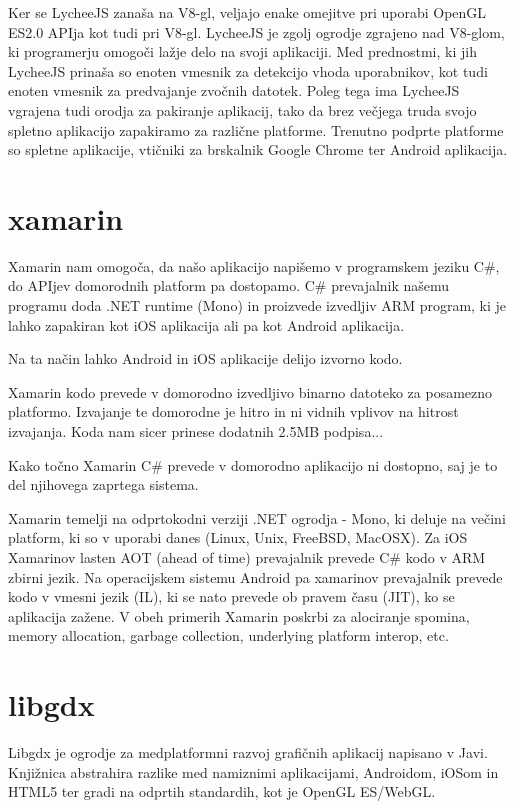 Ker se LycheeJS zanaša na V8-gl, veljajo enake omejitve pri uporabi OpenGL ES2.0 APIja kot tudi pri V8-gl. LycheeJS je zgolj ogrodje zgrajeno nad V8-glom, ki programerju omogoči lažje delo na svoji aplikaciji. Med prednostmi, ki jih LycheeJS prinaša so enoten vmesnik za detekcijo vhoda uporabnikov, kot tudi enoten vmesnik za predvajanje zvočnih datotek. Poleg tega ima LycheeJS vgrajena tudi orodja za pakiranje aplikacij, tako da brez večjega truda svojo spletno aplikacijo zapakiramo za različne platforme. Trenutno podprte platforme so spletne aplikacije, vtičniki za brskalnik Google Chrome ter Android aplikacija.

\section{xamarin}

Xamarin nam omogoča, da našo aplikacijo napišemo v programskem jeziku C\#, do APIjev domorodnih platform pa dostopamo. C\# prevajalnik našemu programu doda .NET runtime (Mono) in proizvede izvedljiv ARM program, ki je lahko zapakiran kot iOS aplikacija ali pa kot Android aplikacija.

Na ta način lahko Android in iOS aplikacije delijo izvorno kodo. 

Xamarin kodo prevede v domorodno izvedljivo binarno datoteko za posamezno platformo. Izvajanje te domorodne je hitro in ni vidnih vplivov na hitrost izvajanja. Koda nam sicer prinese dodatnih 2.5MB podpisa...

Kako točno Xamarin C\# prevede v domorodno aplikacijo ni dostopno, saj je to del njihovega zaprtega sistema. 

Xamarin temelji na odprtokodni verziji .NET ogrodja - Mono, ki deluje na večini platform, ki so v uporabi danes (Linux, Unix, FreeBSD, MacOSX). Za iOS Xamarinov lasten AOT (ahead of time) prevajalnik prevede C\# kodo v ARM zbirni jezik. Na operacijskem sistemu Android pa xamarinov prevajalnik prevede kodo v vmesni jezik (IL), ki se nato prevede ob pravem času (JIT), ko se aplikacija zažene. V obeh primerih Xamarin poskrbi za alociranje spomina, memory allocation, garbage collection, underlying platform interop, etc. 

\section{libgdx\cite{libgdx}}

Libgdx je ogrodje za medplatformni razvoj grafičnih aplikacij napisano v Javi. Knjižnica abstrahira razlike med namiznimi aplikacijami, Androidom, iOSom in HTML5 ter gradi na odprtih standardih, kot je OpenGL ES/WebGL.

